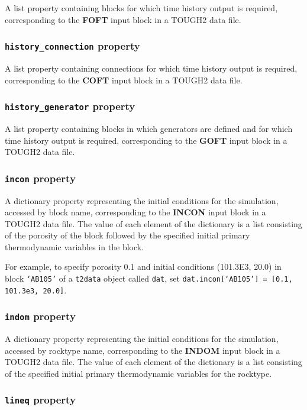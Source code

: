 A list property containing blocks for which time history output is required, corresponding to the \textbf{FOFT} input block in a TOUGH2 data file.

\subsubsection{\texttt{history\_connection} property}

A list property containing connections for which time history output is required, corresponding to the \textbf{COFT} input block in a TOUGH2 data file.

\subsubsection{\texttt{history\_generator} property}

A list property containing blocks in which generators are defined and for which time history output is required, corresponding to the \textbf{GOFT} input block in a TOUGH2 data file.

\subsubsection{\texttt{incon} property}

A dictionary property representing the initial conditions for the simulation, accessed by block name, corresponding to the \textbf{INCON} input block in a TOUGH2 data file.  The value of each element of the dictionary is a list consisting of the porosity of the block followed by the specified initial primary thermodynamic variables in the block.

For example, to specify porosity 0.1 and initial conditions (101.3E3, 20.0) in block \texttt{`AB105'} of a \texttt{t2data} object called \texttt{dat}, set \texttt{dat.incon[`AB105'] = [0.1, 101.3e3, 20.0]}.

\subsubsection{\texttt{indom} property}

A dictionary property representing the initial conditions for the simulation, accessed by rocktype name, corresponding to the \textbf{INDOM} input block in a TOUGH2 data file.  The value of each element of the dictionary is a list consisting of the specified initial primary thermodynamic variables for the rocktype.

\subsubsection{\texttt{lineq} property}

